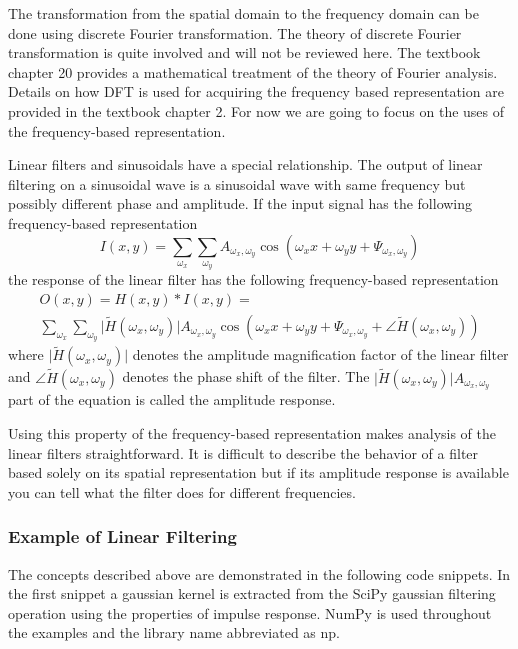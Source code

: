 \documentclass[]{article}
\begin{document}
The transformation from the spatial domain to the frequency domain can be done
using discrete Fourier transformation. The theory of discrete Fourier
transformation is quite involved and will not be reviewed here. The textbook
chapter 20 provides a mathematical treatment of the theory of Fourier analysis.
Details on how DFT is used for acquiring the frequency based representation are
provided in the textbook chapter 2.\cite{naturalimagestatistics} For now we are
going to focus on the uses of the frequency-based representation.

Linear filters and sinusoidals have a special relationship. The output of
linear filtering on a sinusoidal wave is a sinusoidal wave with same frequency
but possibly different phase and amplitude. If the input signal has the
following frequency-based representation
\begin{equation}
  I(x,y) = \sum_{\omega_{x}}{\sum_{\omega_{y}}{A_{\omega_{x},\omega_{y}}\cos(\omega_{x}x+\omega_{y}y+\Psi_{\omega_{x},\omega_{y}})}}
\end{equation}
the response of the linear filter has the following frequency-based representation
\begin{equation}
  \begin{split}
O(x,y) = H(x,y) \ast I(x,y) = \\
   \sum_{\omega_{x}}{\sum_{\omega_{y}}{\lvert \tilde{H}(\omega_{x},\omega_{y})\rvert A_{\omega_{x},\omega_{y}} \cos(\omega_{x} x + \omega_{y} y + \Psi_{\omega_{x},\omega_{y}} + \angle\tilde{H}(\omega_{x},\omega_{y}))}}
  \end{split}
\end{equation}
where $\lvert\tilde{H}(\omega_{x},\omega_{y})\rvert$ denotes the amplitude
magnification factor of the linear filter and
$\angle\tilde{H}(\omega_{x},\omega_{y})$ denotes the phase shift of the filter.
The $\lvert\tilde{H}(\omega_{x},\omega_{y})\rvert A_{\omega_{x},\omega_{y}}$
part of the equation is called the amplitude response.

Using this property of the frequency-based representation makes analysis of the
linear filters straightforward. It is difficult to describe the behavior of a
filter based solely on its spatial representation but if its amplitude response
is available you can tell what the filter does for different frequencies.

\subsubsection{Example of Linear Filtering}
\label{example-of-linear-filtering}
The concepts described above are demonstrated in the following code snippets.
In the first snippet a gaussian kernel is extracted from the SciPy gaussian
filtering operation using the properties of impulse response. NumPy is used
throughout the examples and the library name abbreviated as np.
\end{document}
